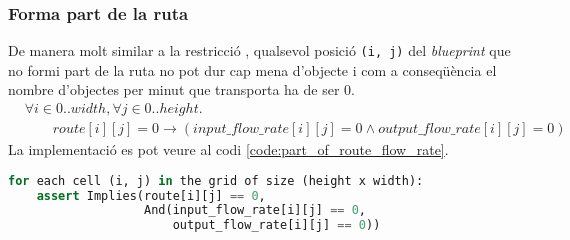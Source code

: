 \subsubsection{Forma part de la ruta}
De manera molt similar a la restricció , qualsevol posició \lstinline{(i, j)} del \textit{blueprint} que no formi part de la ruta no pot dur cap mena d'objecte i com a conseqüència el nombre d'objectes per minut que transporta ha de ser 0.
\begin{align*}
    &\forall i \in 0..width, \forall j \in 0..height. \\
    & \qquad route[i][j]=0 \rightarrow (input\_flow\_rate[i][j] = 0 \land output\_flow\_rate[i][j] = 0)
\end{align*}
La implementació es pot veure al codi \ref{code:part_of_route_flow_rate}.

\begin{lstlisting}[language=Python, caption=Part of Route, label=code:part_of_route_flow_rate]
for each cell (i, j) in the grid of size (height x width):
    assert Implies(route[i][j] == 0, 
                   And(input_flow_rate[i][j] == 0,
                       output_flow_rate[i][j] == 0))
\end{lstlisting}

